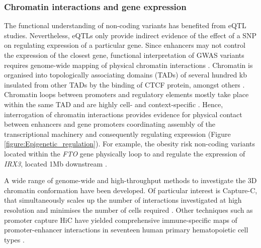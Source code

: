 \subsubsection{Chromatin interactions and gene expression}
The functional understanding of non-coding variants has benefited from eQTL studies. Nevertheless, eQTLs only provide indirect evidence of the effect of a SNP on regulating expression of a particular gene. Since enhancers may not control the expression of the closest gene, functional interpretation of GWAS variants requires genome-wide mapping of physical chromatin interactions \parencite{Smemo2014}. Chromatin is organised into topologically associating domains (TADs) of several hundred kb insulated from other TADs by the binding of CTCF protein, amongst others \parencite{Nora2017}. Chromatin loops between promoters and regulatory elements mostly take place within the same TAD and are highly cell- and context-specific \parencite{Smith2016}. Hence, interrogation of chromatin interactions provides evidence for physical contact between enhancers and gene promoters coordinating assembly of the transcriptional machinery and consequently regulating expression (Figure \ref{figure:Epigenetic_regulation}). For example, the obesity risk non-coding variants located within the \textit{FTO} gene physically loop to and regulate the expression of \textit{IRX3}, located 1Mb downstream \parencite{Smemo2014}.

A wide range of genome-wide and high-throughput methods to investigate the 3D chromatin conformation have been developed. Of particular interest is Capture-C, that simultaneously scales up the number of interactions investigated at high resolution and minimises the number of cells required \parencite{Davies2017,Oudelaar2017}. Other techniques such as promoter capture HiC have yielded comprehensive immune-specific maps of promoter-enhancer interactions in seventeen human primary hematopoietic cell types \parencite{Javierre2016}. %




